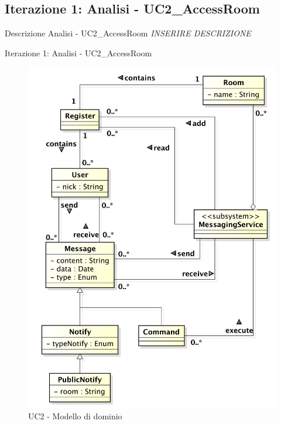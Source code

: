 \documentclass[t]{beamer} %
\begin{document}
\subsection{Iterazione 1: Analisi - UC2\_AccessRoom}
\begin{frame} {Descrizione Analisi - UC2\_AccessRoom}
 \emph{INSERIRE DESCRIZIONE}
\end{frame}

\begin{frame} {Iterazione 1: Analisi - UC2\_AccessRoom}
   \begin{figure}
     \includegraphics[scale=0.29]{image_astah/Iteration_1_DomainModel/UC2_AccessRoom_DM.png}{\centering}
     \caption{UC2 - Modello di dominio}
     \label{fig_UC2_AR_DM} 
   \end{figure}
\end{frame}
\end{document}
